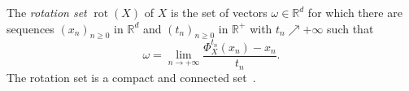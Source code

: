 \documentclass[12pt,reqno,a4paper]{amsart}%
\numberwithin{equation}{section}
\newcommand{\Rr}{{\mathbb{R}}}
\newcommand{\Tt}{{\mathbb{T}}}
\newcommand{\rot}{\operatorname{rot}}
\begin{document}
The \textit{rotation set} $\rot(X)$ of $X$ is the set of vectors $\omega\in\Rr^d$ for which there are sequences $(x_n)_{n\geq0}$ in $\Rr^d$ and $(t_n)_{n\geq0}$ in $\Rr^+$ with
$t_n\nearrow+\infty$ such that
\begin{equation}\label{eq: rot set}
\omega=\lim_{n\to+\infty}\frac{\Phi^{t_n}_X(x_n)-x_n}{t_n}.
\end{equation}
The rotation set is a compact and connected set~\cite{zbMATH04084609}.


%
%
\end{document}
